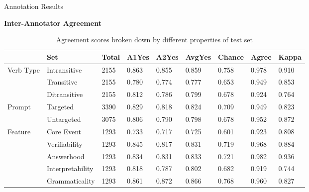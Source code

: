 \documentclass[final,14pt,t]{beamer}
\begin{document}
\begin{frame}{}
\begin{columns}[t]
\begin{column}{.33\linewidth}
\begin{minipage}[t][\textheight]{\linewidth}
\begin{block}{Annotation Results}
\begin{center}
\begin{minipage}{.85\textwidth}
\begin{center}
  \bf Inter-Annotator Agreement
\end{center}
\vspace{-.5em}
\begin{table}[htb!]
\begin{center}
\setlength{\tabcolsep}{0.65em}
\begin{tabular}{|l|l|l|l|l|l||l|l||l|}
\hline
& Set	& Total	& A1Yes & A2Yes & AvgYes & Chance & Agree & Kappa \\
\hline
\hline
\multirow{3}{*}{Verb Type}& Intransitive & 2155 & 0.863 & 0.855 & 0.859 & 0.758 & 0.978 & 0.910 \\
\cline{2-9}
& Transitive & 2155 & 0.780 & 0.774 & 0.777 & 0.653 & 0.949 & 0.853 \\
\cline{2-9}
& Ditransitive & 2155 & 0.812 & 0.786 & 0.799 & 0.678 & 0.924 & 0.764 \\ 
\hline
\hline
\multirow{2}{*}{Prompt} & Targeted & 3390 & 0.829 & 0.818 & 0.824 & 0.709 & 0.949 & 0.823 \\
\cline{2-9}
& Untargeted & 3075 & 0.806 & 0.790 & 0.798 & 0.678 & 0.952 & 0.872 \\
\hline
\hline
\multirow{5}{*}{Feature} & Core Event & 1293 & 0.733 & 0.717 & 0.725 & 0.601 & 0.923 & 0.808 \\
\cline{2-9}
& Verifiability & 1293 & 0.845 & 0.817 & 0.831 & 0.719 & 0.968 & 0.884 \\
\cline{2-9}
& Answerhood & 1293 & 0.834 & 0.831 & 0.833 & 0.721 & 0.982 & 0.936 \\
\cline{2-9}
& Interpretability & 1293 & 0.818 & 0.787 & 0.802 & 0.682 & 0.919 & 0.744 \\
\cline{2-9}
& Grammaticality & 1293 & 0.861 & 0.872 & 0.866 & 0.768 & 0.960 & 0.827 \\
\hline
\end{tabular}
\caption{\label{tab:agreement} Agreement scores broken down by different properties of test set}
\end{center}
\end{table}
\vspace{1em}


\end{minipage}
\end{center}
\end{block}
\end{minipage}
\end{column}
\end{columns}
\end{frame}
\end{document}
